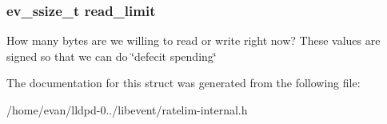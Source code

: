 \subsubsection[{read\-\_\-limit}]{\setlength{\rightskip}{0pt plus 5cm}ev\-\_\-ssize\-\_\-t {\bf read\-\_\-limit}}\label{structev__token__bucket_a6ec8061fef44cbcb150004e465432c84}
\-How many bytes are we willing to read or write right now? \-These values are signed so that we can do \char`\"{}defecit spending\char`\"{} 

\-The documentation for this struct was generated from the following file\-:\begin{DoxyCompactItemize}
\item 
/home/evan/lldpd-\/0../libevent/ratelim-\/internal.\-h\end{DoxyCompactItemize}
